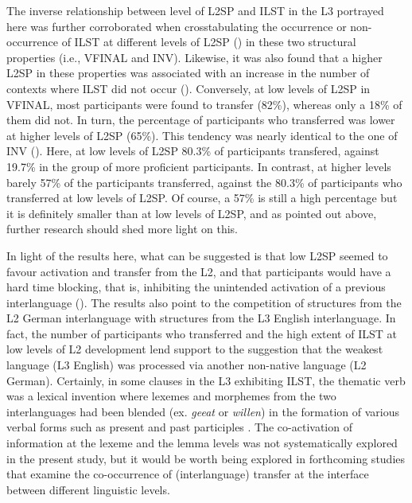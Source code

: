 \documentclass[output=paper,modfonts,nonflat, newtxmath]{langsci/langscibook}
\begin{document}
The inverse relationship between level of L2SP and ILST in the L3 portrayed here was further corroborated when crosstabulating the occurrence or non-oc\-cur\-rence of ILST at different levels of L2SP () in these two structural properties (i.e., VFINAL and INV). Likewise, it was also found that a higher L2SP in these properties was associated with an increase in the number of contexts where ILST did not occur (). Conversely, at low levels of L2SP in VFINAL, most participants were found to transfer (82\%), whereas only a 18\% of them did not. In turn, the percentage of participants who transferred was lower at higher levels of L2SP (65\%). This tendency was nearly identical to the one of INV (). Here, at low levels of L2SP 80.3\% of participants transfered, against 19.7\% in the group of more proficient participants. In contrast, at higher levels barely 57\% of the participants transferred, against the 80.3\% of participants who transferred at low levels of L2SP. Of course, a 57\% is still a high percentage but it is definitely smaller than at low levels of L2SP, and as pointed out above, further research should shed more light on this.

In light of the results here, what can be suggested is that low L2SP seemed to favour activation and transfer from the L2, and that participants would have a hard time blocking, that is, inhibiting the unintended activation of a previous interlanguage (\citealt{Shanon1991, Dewaele2001, DeBot2004, Sánchez2011, SánchezBardel2017}). The results also point to the competition of structures from the L2 German interlanguage with structures from the L3 English interlanguage. In fact, the number of participants who transferred and the high extent of ILST at low levels of L2 development lend support to the suggestion that the weakest language (L3 English) was processed \citep{Abunuwara1992} via another non-native language (L2 German). Certainly, in some clauses in the L3 exhibiting ILST, the thematic verb was a lexical invention where lexemes and morphemes from the two interlanguages had been blended (ex. \textit{geeat} or \textit{willen}) in the formation of various verbal forms such as present and past participles \citep{Sánchez2015L2}. The co-activation of information at the lexeme and the lemma levels was not systematically explored in the present study, but it would be worth being explored in forthcoming studies that examine the co-occurrence of (interlanguage) transfer at the interface between different linguistic levels.
\end{document}
